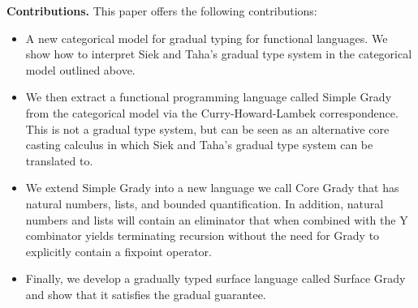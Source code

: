 \textbf{Contributions.} This paper offers the following contributions:
\begin{itemize}

\item A new categorical model for gradual typing for functional
  languages.  We show how to interpret Siek and Taha's
  \cite{Siek:2015} gradual type system in the categorical model
  outlined above.

\item We then extract a functional programming language called Simple
  Grady from the categorical model via the Curry-Howard-Lambek
  correspondence.  This is not a gradual type system, but can be seen
  as an alternative core casting calculus in which Siek and Taha's
  gradual type system can be translated to.
  
\item We extend Simple Grady into a new language we call Core Grady
  that has natural numbers, lists, and bounded quantification. In
  addition, natural numbers and lists will contain an eliminator that
  when combined with the Y combinator yields terminating recursion
  without the need for Grady to explicitly contain a fixpoint
  operator.

\item Finally, we develop a gradually typed surface language called
  Surface Grady and show that it satisfies the gradual guarantee.

\end{itemize}

